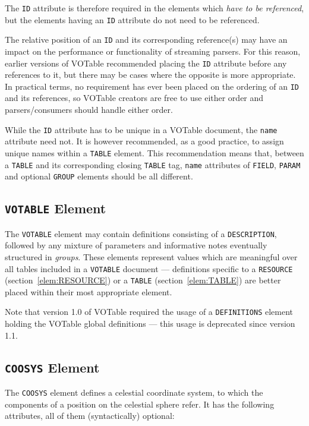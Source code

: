 \documentclass[11pt,a4paper]{ivoa}
\def\Aref#1{section~\ref{#1}}
\let\fg=\color
\def\slash {{\fg{blue}/}}
\def\attr#1{{\tt{\fg{DarkRed}#1}}}
\def\elem#1{{\tt{\fg{DarkRed}#1}}}
\begin{document}
The {\attr{ID}} attribute %
is therefore required in the elements which {\em have to be referenced},
but the elements having an {\attr{ID}} attribute do not need to be
referenced.

The relative position of an \attr{ID} and its corresponding reference(s)
may have an impact on the performance or functionality of streaming parsers.
For this reason, earlier versions of VOTable recommended placing
the \attr{ID} attribute before any references to it,
but there may be cases where the opposite is more appropriate.
In practical terms, no requirement has ever been placed on the ordering
of an \attr{ID} and its references, so VOTable creators are free to use either
order and parsers/consumers should handle either order.

While the {\attr{ID}} attribute has to be unique in a VOTable document,
the {\attr{name}} attribute need not. It is however recommended,
as a good practice, to assign unique names within a \elem{TABLE} element.
This recommendation means that,
between a \elem{TABLE} and its corresponding closing \elem{\slash TABLE} tag,
{\attr{name}} attributes of \elem{FIELD}, \elem{PARAM} and
optional \elem{GROUP} elements should be all different.

\subsection{\elem{VOTABLE} Element}
\label{sec:definitions}

The \elem{VOTABLE} element may contain definitions consisting of
a \elem{DESCRIPTION}, followed by any mixture of parameters and
informative notes eventually structured in {\em groups}.
These elements represent values which are meaningful over all tables
included in a \elem{VOTABLE} document --- definitions specific to
a \elem{RESOURCE} (\Aref{elem:RESOURCE})
or a \elem{TABLE} (\Aref{elem:TABLE}) are better placed
within their most appropriate element.

Note that version 1.0 of VOTable required the usage of a \elem{DEFINITIONS}
element holding the VOTable global definitions --- this
usage is deprecated since version 1.1.

\subsection{\elem{COOSYS} Element}
\label{elem:COOSYS}

The \elem{COOSYS} element defines a celestial coordinate system, to
which the components of a position on the celestial sphere refer.  It
has the following attributes, all of them (syntactically) optional:
\end{document}
